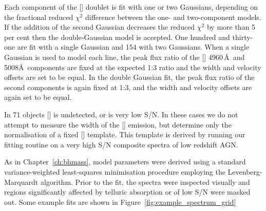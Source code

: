Each component of the [] doublet is fit with one or two Gaussians, depending on the fractional reduced $\chi^2$ difference between the one- and two-component models. 
If the addition of the second Gaussian decreases the reduced $\chi^2$ by more than 5 per cent then the double-Gaussian model is accepted.
One hundred and thirty-one are fit with a single Gaussian and 154 with two Gaussians. 
When a single Gaussian is used to model each line, the peak flux ratio of the [] 4960\,\AA\, and 5008\AA\, components are fixed at the expected 1:3 ratio and the width and velocity offsets are set to be equal.
In the double Gaussian fit, the peak flux ratio of the second components is again fixed at 1:3, and the width and velocity offsets are again set to be equal. 

In 71 objects [] is undetected, or is very low \ac{S/N}. 
In these cases we do not attempt to measure the width of the [] emission, but determine only the normalisation of a fixed [] template.
This template is derived by running our fitting routine on a very high \ac{S/N} composite spectra of low redshift \ac{AGN}. 

As in Chapter~\ref{ch:bhmass}, model parameters were derived using a standard variance-weighted least-squares minimisation procedure employing the Levenberg-Marquardt algorithm. 
Prior to the fit, the spectra were inspected visually and regions significantly affected by telluric absorption or of low \ac{S/N} were masked out.
Some example fits are shown in Figure~\ref{fig:example_spectrum_grid}

